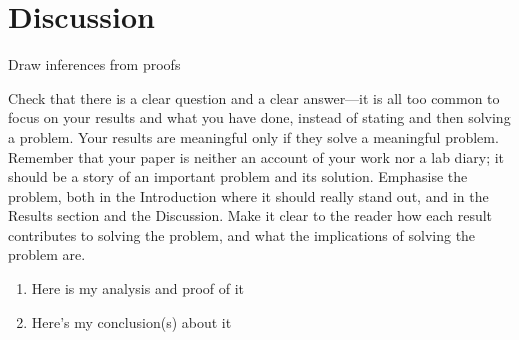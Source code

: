 \chapter{Discussion} \label{Chapter: Discussion}

Draw inferences from proofs

Check that there is a clear question and a clear answer—it is all too common to focus on your results and what you have done, instead of stating and then solving a problem. Your results are meaningful only if they solve a meaningful problem. Remember that your paper is neither an account of your work nor a lab diary; it should be a story of an important problem and its solution. Emphasise the problem, both in the Introduction where it should really stand out, and in the Results section and the Discussion. Make it clear to the reader how each result contributes to solving the problem, and what the implications of solving the problem are.

\begin{enumerate}
\item Here is my analysis and proof of it
\item Here's my conclusion(s) about it
\end{enumerate}
